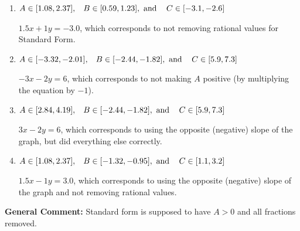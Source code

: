 \documentclass{extbook}[14pt]
\begin{document}
\begin{enumerate}
{\begin{enumerate}[label=\Alph*.]
* $3x + 2y = -6$, which is the correct option.
\item \( A \in [1.08, 2.37], \hspace{3mm} B \in [0.59, 1.23], \text{ and } \hspace{3mm} C \in [-3.1, -2.6] \)

 $1.5x + 1y = -3.0$, which corresponds to not removing rational values for Standard Form.
\item \( A \in [-3.32, -2.01], \hspace{3mm} B \in [-2.44, -1.82], \text{ and } \hspace{3mm} C \in [5.9, 7.3] \)

 $-3x - 2y = 6$, which corresponds to not making $A$ positive (by multiplying the equation by $-1$).
\item \( A \in [2.84, 4.19], \hspace{3mm} B \in [-2.44, -1.82], \text{ and } \hspace{3mm} C \in [5.9, 7.3] \)

 $3x - 2y = 6$, which corresponds to using the opposite (negative) slope of the graph, but did everything else correctly.
\item \( A \in [1.08, 2.37], \hspace{3mm} B \in [-1.32, -0.95], \text{ and } \hspace{3mm} C \in [1.1, 3.2] \)

 $1.5x - 1y = 3.0$, which corresponds to using the opposite (negative) slope of the graph and not removing rational values.
\end{enumerate}

\textbf{General Comment:} Standard form is supposed to have $A > 0$ and all fractions removed.
}
\end{enumerate}
\end{document}
